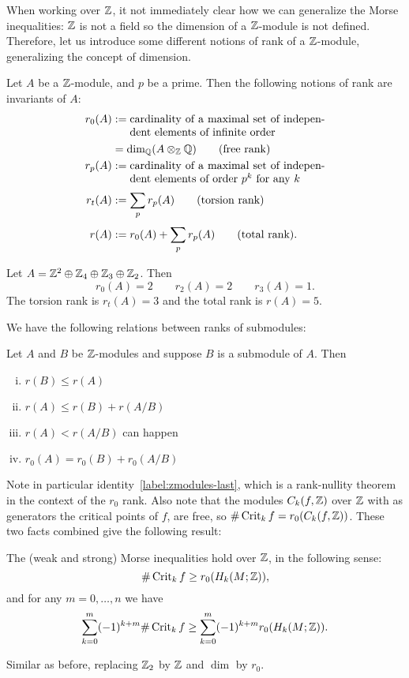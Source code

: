 When working over $\mathbb{Z}$, it not immediately clear how we can generalize the Morse inequalities: $ \mathbb{Z}$ is not a field so the dimension of a $\mathbb{Z}$-module is not defined.
Therefore, let us introduce some different notions of rank of a $\mathbb{Z}$-module, generalizing the concept of dimension.
\begin{definition}
    Let $A$ be a  $\mathbb{Z}$-module, and $p$ be a prime.
    Then the following notions of rank are invariants of $A$:
    \begin{align*}
        r_0(A) &:= \parbox[t]{6.2cm}{cardinality of a maximal set of independent elements of infinite order}\\[0.3em]
            &= \dim_{\Q}(A \otimes_{\Z} \Q) \tag{free rank}
            \\
        r_p(A) &:= \parbox[t]{6.2cm}{cardinality of a maximal set of independent elements of order $p^{k}$ for any $k$}\\[0.3em]
        r_t(A) &:= \sum_{p} r_p(A) \tag{torsion rank}
        \\[0.3em]
        r(A) &:= r_0(A) + \sum_{p}r_p(A) \tag{total rank}
    .\end{align*}
\end{definition}
\begin{eg}
    Let $A = \mathbb{Z}^2 \oplus \mathbb{Z}_4 \oplus \mathbb{Z}_3 \oplus \mathbb{Z}_2$.
    Then
    \[
        r_0(A) = 2 \qquad
        r_2(A) = 2 \qquad
        r_3(A) = 1
    .\]
    The torsion rank is $r_t(A) = 3$ and the total rank is $r(A) = 5$.
\end{eg}
We have the following relations between ranks of submodules:
\begin{lemma}
    Let $A$ and $B$ be $\mathbb{Z}$-modules and suppose $B$ is a submodule of $A$.
    Then
    \begin{enumerate}[(i)]
        \item $r(B) \le  r(A)$
        \item $r(A) \le  r(B) + r(A / B)$
        \item $r(A) < r(A / B)$ can happen
        \item  $ r_0(A) = r_0(B) + r_0(A/B)$ \label{label:zmodules-last}
    \end{enumerate}
\end{lemma}

Note in particular identity~\ref{label:zmodules-last}, which is a rank-nullity theorem in the context of the $r_0$ rank.
Also note that the modules $C_k(f, \mathbb{Z})$ over $\mathbb{Z}$ with as generators the critical points of $f$, are free, so $\# \operatorname{Crit}_k f =r_0(C_k(f, \mathbb{Z}))$.
These two facts combined give the following result:
\begin{theorem}
    The (weak and strong) Morse inequalities hold over $\mathbb{Z}$, in the following sense:
    \[
        \# \operatorname{Crit}_k f \ge  r_0(H_k(M; \mathbb{Z}))
    ,\]
    and for any $m = 0, \ldots, n$ we have
        \[
            \sum_{k=0}^{m} (-1)^{k+m} \# \operatorname{Crit}_k f \ge  \sum_{k=0}^{m} (-1)^{k+m} r_0(H_k(M; \mathbb{Z}))
        .\]
\end{theorem}
\begin{myproof}
    Similar as before, replacing $\mathbb{Z}_2$ by $\mathbb{Z}$ and $\dim$ by $r_0$.
\end{myproof}




